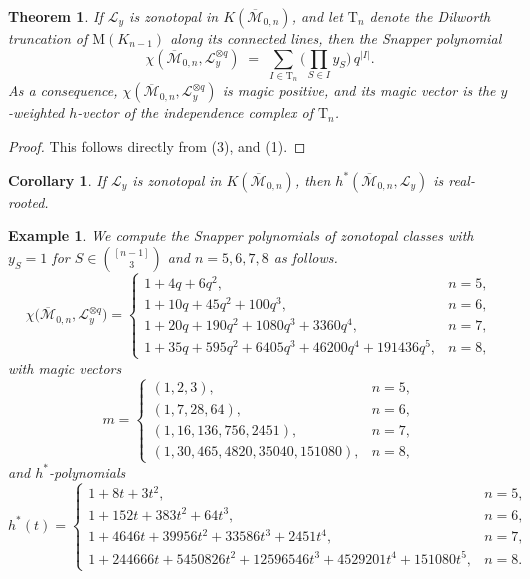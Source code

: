 \documentclass[11pt,a4paper,reqno]{amsart}
\theoremstyle{results}
\newtheorem{corollary}[thm]{Corollary}
\theoremstyle{definitions}
\newtheorem{example}[thm]{Example}
\newcommand{\M}{\mathrm{M}}
\newtheorem{theorem}[thm]{Theorem}
\newcommand{\hstar}{h^{*}}
\newcommand{\cL}{\mathcal{L}}
\newcommand{\DT}{\mathrm{T}}      %
\newcommand{\Mbar}{\overline{\mathcal M}}
\begin{document}
\begin{theorem}\label{thm:m0n-triples}
  If $\cL_y$ is zonotopal in $K(\Mbar_{0, n})$, and let $\DT_n$ denote the Dilworth truncation of $\M(K_{n-1})$ along its connected lines, 
  then the Snapper polynomial 
  \[
    \chi(\Mbar_{0, n}, \cL_y^{\otimes q}) \;=\; \sum_{I \in \DT_n} \Big(\prod_{S \in I} y_S\Big)\, q^{|I|} .
  \]
  As a consequence, $\chi(\Mbar_{0, n}, \cL_y^{\otimes q})$ is magic positive, and its magic vector is the $y$-weighted
  $h$-vector of the independence complex of $\DT_n$.
\end{theorem}

\begin{proof}
  This follows directly from (3),  and (1). 
\end{proof}

\begin{corollary}
  If $\cL_y$ is zonotopal in $K(\Mbar_{0, n})$, then $\hstar(\Mbar_{0,n}, \cL_y)$ is
  real-rooted.
\end{corollary}


\begin{example}\label{ex:m0n-small}
  We compute the Snapper polynomials of zonotopal classes with $y_S = 1$ for $S \in \binom{[n-1]}{3}$ and $n = 5, 6, 7,8$ as follows. 
  \[
    \chi\big(\Mbar_{0,n}, \cL_y^{\otimes q}\big) =
    \begin{cases}
      1 + 4q + 6q^2, & n = 5, \\
      1 + 10q + 45q^2 + 100q^3, & n = 6, \\
      1 + 20q + 190q^2 + 1080q^3 + 3360q^4, & n = 7, \\
      1 + 35q + 595q^2 + 6405q^3 + 46200q^4 + 191436q^5, & n = 8,
    \end{cases}
  \]
  with magic vectors
  \[
    m =
    \begin{cases}
      (1,2,3), & n = 5, \\
      (1,7,28,64), & n = 6, \\
      (1,16,136,756,2451), & n = 7, \\
      (1,30,465,4820,35040,151080), & n = 8,
    \end{cases}
  \]
  and $\hstar$-polynomials
  \[
    \hstar(t) =
    \begin{cases}
      1 + 8t + 3t^2, & n = 5, \\
      1 + 152t + 383t^2 + 64t^3, & n = 6, \\
      1 + 4646t + 39956t^2 + 33586t^3 + 2451t^4, & n = 7, \\
      1 + 244666t + 5450826t^2 + 12596546t^3 + 4529201t^4 + 151080t^5, & n = 8.
    \end{cases}
  \]
\end{example}
\end{document}
